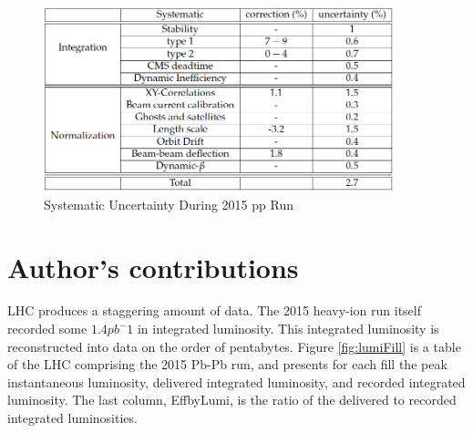 \begin{figure}[]
\begin{centering}
\includegraphics[width=4in]{Chapter4/importfigs/CMS-PAS-LUM-15-001_Table_001.png}
\par\end{centering}
\caption{Systematic Uncertainty During 2015 pp Run \cite{CMS:2013gfa} \label{fig:sysLumiError}}
\end{figure}


\section{Author's contributions}

LHC produces a staggering amount of data. The 2015 heavy-ion run itself recorded some $1.4 pb^-1$ in integrated luminosity. This integrated luminosity is reconstructed into data on the order of pentabytes. Figure \ref{fig:lumiFill} is a table of the LHC comprising the 2015 Pb-Pb run, and presents for each fill the peak instantaneous luminosity, delivered integrated luminosity, and recorded integrated luminosity. The last column, EffbyLumi, is the ratio of the delivered to recorded integrated luminosities.  

